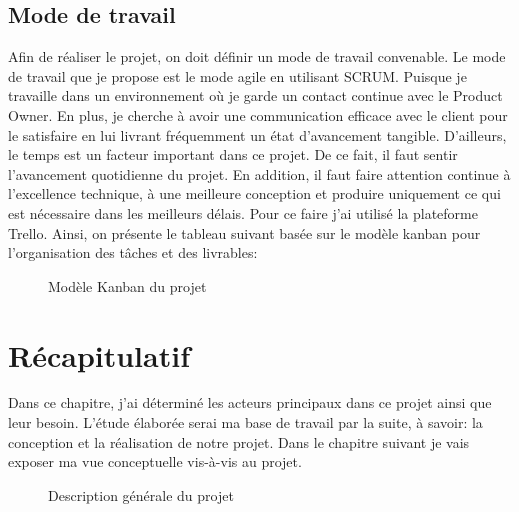 \subsection{Mode de travail}
Afin de réaliser le projet, on doit définir un mode de travail convenable. Le mode de
travail que je propose est le mode agile en utilisant SCRUM. Puisque je travaille
dans un environnement où je garde un contact continue avec le Product Owner. En
plus, je cherche à avoir une communication efficace avec le client pour le
satisfaire en lui livrant fréquemment un état d'avancement tangible.
D'ailleurs, le temps est un facteur important dans ce projet. De ce fait, il faut sentir
l’avancement quotidienne du projet. En addition, il faut faire attention continue à
l’excellence technique, à une meilleure conception et produire uniquement ce qui est
nécessaire dans les meilleurs délais. Pour ce faire j'ai utilisé la plateforme Trello. Ainsi, on présente le tableau suivant basée sur le modèle kanban pour l'organisation des tâches et des livrables:
\begin{figure}[H]
    \begin{center}
        \caption{Modèle Kanban du projet}
    \end{center}
\end{figure}
\section{Récapitulatif}
Dans ce chapitre, j'ai déterminé les acteurs principaux dans ce projet ainsi que leur
besoin. L'étude élaborée serai ma base de travail par la suite, à
savoir: la conception et la réalisation de notre projet. Dans le chapitre suivant je vais
exposer ma vue conceptuelle vis-à-vis au projet.
\begin{figure}[H]
    \begin{center}
        \caption{Description générale du projet}
    \end{center}
\end{figure}

